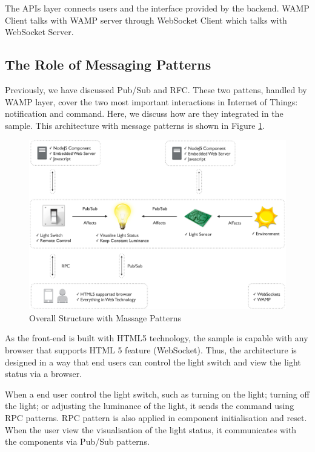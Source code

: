 The APIs layer connects users and the interface provided by the backend. WAMP Client talks with WAMP server through WebSocket Client which talks with WebSocket Server.

\subsection{The Role of Messaging Patterns}
Previously, we have discussed Pub/Sub and RFC. These two pattens, handled by WAMP layer, cover the two most important interactions in Internet of Things: notification and command. Here, we discuss how are they integrated in the sample. This architecture with message patterns is shown in Figure \ref{fig:message-pattern-overall-structure}.

\begin{figure}[ht]
  \begin{center}
    \includegraphics[width=1\textwidth]{images/message-pattern-overall-structure.pdf}
    \caption{Overall Structure with Massage Patterns}
    \label{fig:message-pattern-overall-structure}
  \end{center}
\end{figure}

As the front-end is built with HTML5 technology, the sample is capable with any browser that supports HTML 5 feature (WebSocket). Thus, the architecture is designed in a way that end users can control the light switch and view the light status via a browser. 

When a end user control the light switch, such as turning on the light; turning off the light; or adjusting the luminance of the light, it sends the command using RPC patterns. RPC pattern is also applied in component initialisation and reset. When the user view the visualisation of the light status, it communicates with the components via Pub/Sub patterns.

